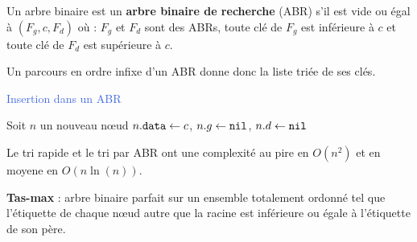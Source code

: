 \documentclass[a4paper,11pt,twocolumn]{article}
\begin{document}
	\begin{defn}
	Un arbre binaire est un \textbf{arbre binaire de recherche} (ABR) s'il est vide ou égal à $(F_g,c,F_d)$ où : $F_g$ et $F_d$ sont des ABRs, toute clé de $F_g$ est inférieure à $c$ et toute clé de $F_d$ est supérieure à $c$.
	\end{defn}

	Un parcours en ordre infixe d'un ABR donne donc la liste triée de ses clés.

	\begin{algorithm}[h]
	\caption{\textcolor{RoyalBlue}{Insertion dans un ABR}}
	{
		{
			Soit $n$ un nouveau nœud \;
			$n.\texttt{data} \leftarrow c$, $n.g \leftarrow \texttt{nil}$, $n.d \leftarrow \texttt{nil}$ \;
		}
		\Sinon
		{
		}
	}
	\end{algorithm}

	\begin{pop}
	Le tri rapide et le tri par ABR ont une complexité au pire en $O \left( n^2 \right)$ et en moyene en $O(n\ln(n))$.
	\end{pop}

	\begin{defn}
	\textbf{Tas-max} : arbre binaire parfait sur un ensemble totalement ordonné tel que l'étiquette de chaque nœud autre que la racine est inférieure ou égale à l'étiquette de son père.
	\end{defn}
\end{document}
